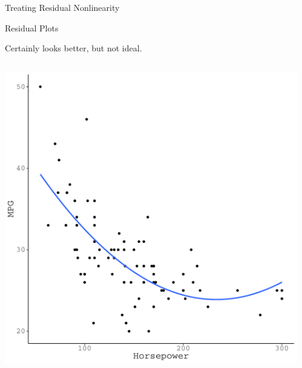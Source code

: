 \documentclass[10pt]{beamer}\usepackage[]{graphicx}\usepackage[]{color}
\makeatletter
\def\maxwidth{ %
  \ifdim\Gin@nat@width>\linewidth
    \linewidth
  \else
    \Gin@nat@width
  \fi
}
\newenvironment{knitrout}{}{} %
\makeatother
\begin{document}
{\begin{frame}{Treating Residual Nonlinearity}
\end{frame}

\watermarkoff %

\begin{frame}{Residual Plots}

  Certainly looks better, but not ideal.
  \vb
  \begin{columns}
    \begin{column}{0.5\textwidth}

\begin{knitrout}\footnotesize
{}\color{fgcolor}

{\centering \includegraphics[width=\maxwidth]{figure/assumptions-unnamed-chunk-15-1} 

}


\end{knitrout}

\end{column}

\begin{column}{0.5\textwidth}

\begin{knitrout}\footnotesize
{}\color{fgcolor}


\end{knitrout}
\end{column}
\end{columns}
\end{frame}}
\end{document}
